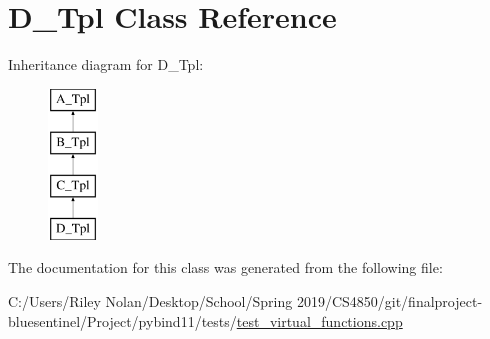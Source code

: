 \hypertarget{class_d___tpl}{}\section{D\+\_\+\+Tpl Class Reference}
\label{class_d___tpl}
Inheritance diagram for D\+\_\+\+Tpl\+:\begin{figure}[H]
\begin{center}
\leavevmode
\includegraphics[height=4.000000cm]{class_d___tpl}
\end{center}
\end{figure}


The documentation for this class was generated from the following file\+:\begin{DoxyCompactItemize}
\item 
C\+:/\+Users/\+Riley Nolan/\+Desktop/\+School/\+Spring 2019/\+C\+S4850/git/finalproject-\/bluesentinel/\+Project/pybind11/tests/\mbox{\hyperlink{test__virtual__functions_8cpp}{test\+\_\+virtual\+\_\+functions.\+cpp}}\end{DoxyCompactItemize}
